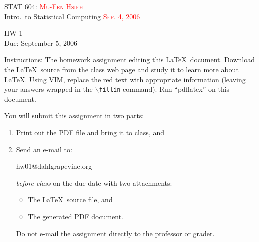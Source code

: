 \documentclass[12pt]{article}
\newcommand{\fillin}[1]{\textcolor{red}{\textsc{#1}}}
\begin{document}
STAT 604: \hfill \fillin{Mu-Fen Hsieh}\\
Intro.\ to Statistical Computing \hfill \fillin{Sep. 4, 2006}

\begin{center}
\Large HW 1\\
\normalsize Due: September 5, 2006
\end{center}

Instructions:  The homework assignment editing this \LaTeX\ document.  Download the \LaTeX\ source from the class web page and study
it to learn more about \LaTeX.  Using VIM, replace the red text with appropriate information (leaving your answers wrapped in the
\texttt{$\backslash$fillin} command).  Run ``pdflatex'' on this document.

You will submit this assignment in two parts:
\begin{enumerate}
\item Print out the PDF file and bring it to class, and
\item Send an e-mail to:
\begin{center}
hw01@dahlgrapevine.org
\end{center}
\emph{before class} on the due date with two attachments:
\begin{itemize}
\item The \LaTeX\ source file, and
\item The generated PDF document.
\end{itemize}
Do not e-mail the assignment directly to the professor or grader.
\end{enumerate}
\end{document}
